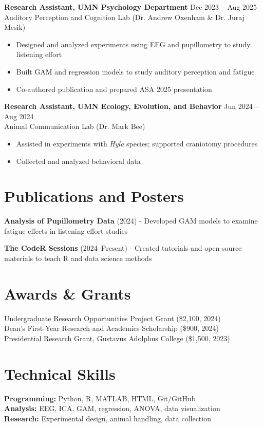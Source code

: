 \documentclass[11pt]{article}
\begin{document}
\textbf{Research Assistant, UMN Psychology Department} \hfill Dec 2023 -- Aug 2025 \\
Auditory Perception and Cognition Lab (Dr. Andrew Oxenham \& Dr. Juraj Mesik) 
\begin{itemize}
  \item Designed and analyzed experiments using EEG and pupillometry to study listening effort  
  \item Built GAM and regression models to study auditory perception and fatigue  
  \item Co-authored publication and prepared ASA 2025 presentation  
\end{itemize}

\textbf{Research Assistant, UMN Ecology, Evolution, and Behavior} \hfill Jun 2024 -- Aug 2024 \\
Animal Communication Lab (Dr. Mark Bee) 
\begin{itemize}
  \item Assisted in experiments with \textit{Hyla} species; supported craniotomy procedures  
  \item Collected and analyzed behavioral data  
\end{itemize}

\section*{Publications and Posters}
\textbf{Analysis of Pupillometry Data} (2024)  
- Developed GAM models to examine fatigue effects in listening effort studies  

\textbf{The CodeR Sessions} (2024--Present)  
- Created tutorials and open-source materials to teach R and data science methods  

\section*{Awards \& Grants}
Undergraduate Research Opportunities Project Grant (\$2,100, 2024) \\
Dean’s First-Year Research and Academics Scholarship (\$900, 2024) \\
Presidential Research Grant, Gustavus Adolphus College (\$1,500, 2023)  

\section*{Technical Skills}
\textbf{Programming:} Python, R, MATLAB, HTML, Git/GitHub \\
\textbf{Analysis:} EEG, ICA, GAM, regression, ANOVA, data visualization \\
\textbf{Research:} Experimental design, animal handling, data collection  
\end{document}

